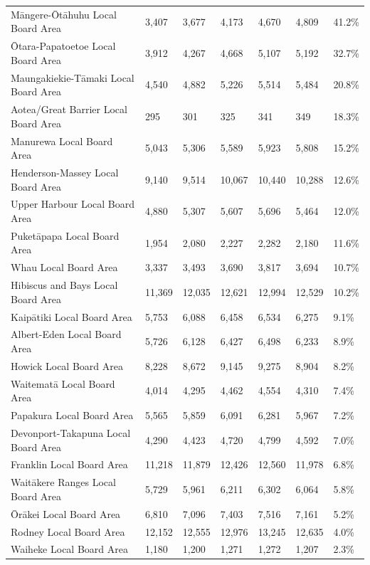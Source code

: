 \documentclass[
  letterpaper,
  DIV=11,
  numbers=noendperiod]{scrartcl}
\begin{document}
{\begin{longtable}[]{@{}lllllll@{}}
\endlastfoot
Māngere-Ōtāhuhu Local Board Area & 3,407 & 3,677 & 4,173 & 4,670 & 4,809
& 41.2\% \\
Ōtara-Papatoetoe Local Board Area & 3,912 & 4,267 & 4,668 & 5,107 &
5,192 & 32.7\% \\
Maungakiekie-Tāmaki Local Board Area & 4,540 & 4,882 & 5,226 & 5,514 &
5,484 & 20.8\% \\
Aotea/Great Barrier Local Board Area & 295 & 301 & 325 & 341 & 349 &
18.3\% \\
Manurewa Local Board Area & 5,043 & 5,306 & 5,589 & 5,923 & 5,808 &
15.2\% \\
Henderson-Massey Local Board Area & 9,140 & 9,514 & 10,067 & 10,440 &
10,288 & 12.6\% \\
Upper Harbour Local Board Area & 4,880 & 5,307 & 5,607 & 5,696 & 5,464 &
12.0\% \\
Puketāpapa Local Board Area & 1,954 & 2,080 & 2,227 & 2,282 & 2,180 &
11.6\% \\
Whau Local Board Area & 3,337 & 3,493 & 3,690 & 3,817 & 3,694 &
10.7\% \\
Hibiscus and Bays Local Board Area & 11,369 & 12,035 & 12,621 & 12,994 &
12,529 & 10.2\% \\
Kaipātiki Local Board Area & 5,753 & 6,088 & 6,458 & 6,534 & 6,275 &
9.1\% \\
Albert-Eden Local Board Area & 5,726 & 6,128 & 6,427 & 6,498 & 6,233 &
8.9\% \\
Howick Local Board Area & 8,228 & 8,672 & 9,145 & 9,275 & 8,904 &
8.2\% \\
Waitematā Local Board Area & 4,014 & 4,295 & 4,462 & 4,554 & 4,310 &
7.4\% \\
Papakura Local Board Area & 5,565 & 5,859 & 6,091 & 6,281 & 5,967 &
7.2\% \\
Devonport-Takapuna Local Board Area & 4,290 & 4,423 & 4,720 & 4,799 &
4,592 & 7.0\% \\
Franklin Local Board Area & 11,218 & 11,879 & 12,426 & 12,560 & 11,978 &
6.8\% \\
Waitākere Ranges Local Board Area & 5,729 & 5,961 & 6,211 & 6,302 &
6,064 & 5.8\% \\
Ōrākei Local Board Area & 6,810 & 7,096 & 7,403 & 7,516 & 7,161 &
5.2\% \\
Rodney Local Board Area & 12,152 & 12,555 & 12,976 & 13,245 & 12,635 &
4.0\% \\
Waiheke Local Board Area & 1,180 & 1,200 & 1,271 & 1,272 & 1,207 &
2.3\% \\

\end{longtable}

}
\end{document}

